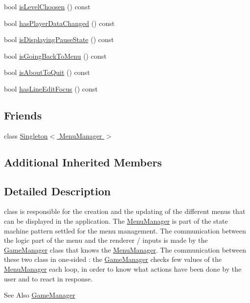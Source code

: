 \begin{DoxyCompactItemize}
\item 
bool \hyperlink{class_symp_1_1_menu_manager_aaa7d3a536403f627754e64ee5c114d27}{is\-Level\-Choosen} () const 
\item 
bool \hyperlink{class_symp_1_1_menu_manager_a8eb4df2e26cc37ff570bdf354a32c95a}{has\-Player\-Data\-Changed} () const 
\item 
bool \hyperlink{class_symp_1_1_menu_manager_a02fc45774d586755ddf6d08254871585}{is\-Displaying\-Pause\-State} () const 
\item 
bool \hyperlink{class_symp_1_1_menu_manager_a8548b544558743f071ccac90d213142e}{is\-Going\-Back\-To\-Menu} () const 
\item 
bool \hyperlink{class_symp_1_1_menu_manager_aa02080bbe6450c1fa0b65273e2a1393f}{is\-About\-To\-Quit} () const 
\item 
bool \hyperlink{class_symp_1_1_menu_manager_a6a546f68374b72ee1429c1c4e8a8ebc9}{has\-Line\-Edit\-Focus} () const 
\end{DoxyCompactItemize}
\subsection*{Friends}
\begin{DoxyCompactItemize}
\item 
class \hyperlink{class_symp_1_1_menu_manager_a604424b0d8b0846c826e4e8122ba2f46}{Singleton$<$ Menu\-Manager $>$}
\end{DoxyCompactItemize}
\subsection*{Additional Inherited Members}


\subsection{Detailed Description}
class is responsible for the creation and the updating of the different menus that can be displayed in the application. The \hyperlink{class_symp_1_1_menu_manager}{Menu\-Manager} is part of the state machine pattern settled for the menu management. The communication between the logic part of the menu and the renderer / inputs is made by the \hyperlink{class_symp_1_1_game_manager}{Game\-Manager} class that knows the \hyperlink{class_symp_1_1_menu_manager}{Menu\-Manager}. The communication between these two class in one-\/sided \-: the \hyperlink{class_symp_1_1_game_manager}{Game\-Manager} checks few values of the \hyperlink{class_symp_1_1_menu_manager}{Menu\-Manager} each loop, in order to know what actions have been done by the user and to react in response. \begin{DoxySeeAlso}{See Also}
\hyperlink{class_symp_1_1_game_manager}{Game\-Manager} 
\end{DoxySeeAlso}


